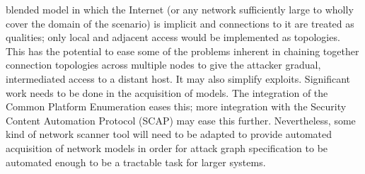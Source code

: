 blended model in which the Internet (or any network sufficiently large to
wholly cover the domain of the scenario) is implicit and connections to it are
treated as qualities; only local and adjacent access would be implemented as
topologies. This has the potential to ease some of the problems inherent in
chaining together connection topologies across multiple nodes to give the
attacker gradual, intermediated access to a distant host. It may also simplify
exploits.
Significant work needs to be done in the acquisition of models. The integration
of the Common Platform Enumeration eases this; more integration with the
Security Content Automation Protocol (SCAP) may ease this further. %
Nevertheless, some kind of network scanner tool will need to be adapted to
provide automated acquisition of network models in order for attack graph
specification to be automated enough to be a tractable task for larger systems.

